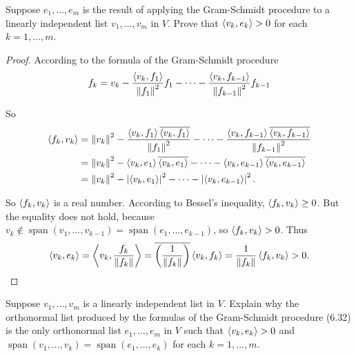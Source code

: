 \begin{exercise}\label{chapter6:sectionB:exercise9}
    Suppose $e_{1} , \ldots, e_{m}$ is the result of applying the Gram-Schmidt procedure to a linearly independent list $v_{1}, \ldots, v_{m}$ in $V$. Prove that $\left\langle{v_{k}, e_{k}}\right\rangle > 0$ for each $k = 1, \ldots, m$.
\end{exercise}

\begin{proof}
    According to the formula of the Gram-Schmidt procedure
    \[
        f_{k} = v_{k} - \frac{\left\langle{v_{k}, f_{1}}\right\rangle}{\left\Vert{f_{1}}\right\Vert^{2}}f_{1} - \cdots - \frac{\left\langle{v_{k}, f_{k-1}}\right\rangle}{\left\Vert{f_{k-1}}\right\Vert^{2}}f_{k-1}
    \]

    So
    \begin{align*}
        \left\langle{f_{k}, v_{k}}\right\rangle & = \left\Vert{v_{k}}\right\Vert^{2} - \frac{\left\langle{v_{k}, f_{1}}\right\rangle\overline{\left\langle{v_{k}, f_{1}}\right\rangle}}{\left\Vert{f_{1}}\right\Vert^{2}} - \cdots - \frac{\left\langle{v_{k}, f_{k-1}}\right\rangle\overline{\left\langle{v_{k}, f_{k-1}}\right\rangle}}{\left\Vert{f_{k-1}}\right\Vert^{2}} \\
                                 & = \left\Vert{v_{k}}\right\Vert^{2} - \left\langle{v_{k}, e_{1}}\right\rangle\overline{\left\langle{v_{k}, e_{1}}\right\rangle} - \cdots - \left\langle{v_{k}, e_{k-1}}\right\rangle\overline{\left\langle{v_{k}, e_{k-1}}\right\rangle}                                                     \\
                                 & = \left\Vert{v_{k}}\right\Vert^{2} - \left\vert{\left\langle{v_{k}, e_{1}}\right\rangle}\right\vert^{2} - \cdots - \left\vert{\left\langle{v_{k}, e_{k-1}}\right\rangle}\right\vert^{2}.
    \end{align*}

    So $\left\langle{f_{k}, v_{k}}\right\rangle$ is a real number. According to Bessel's inequality, $\left\langle{f_{k}, v_{k}}\right\rangle\geq 0$. But the equality does not hold, because $v_{k}\notin\operatorname{span}(v_{1}, \ldots, v_{k-1}) = \operatorname{span}(e_{1}, \ldots, e_{k-1})$, so $\left\langle{f_{k}, v_{k}}\right\rangle > 0$. Thus
    \[
        \left\langle{v_{k}, e_{k}}\right\rangle = \left\langle{v_{k}, \frac{f_{k}}{\left\Vert{f_{k}}\right\Vert}}\right\rangle = \overline{\left(\frac{1}{\left\Vert{f_{k}}\right\Vert}\right)}\left\langle{v_{k}, f_{k}}\right\rangle = \frac{1}{\left\Vert{f_{k}}\right\Vert}\left\langle{f_{k}, v_{k}}\right\rangle > 0.
    \]
\end{proof}
\newpage

\begin{exercise}\label{chapter6:sectionB:exercise10}
    Suppose $v_{1}, \ldots, v_{m}$ is a linearly independent list in $V$. Explain why the orthonormal list produced by the formulas of the Gram-Schmidt procedure (6.32) is the only orthonormal list $e_{1} , \ldots, e_{m}$ in $V$ such that $\left\langle{v_{k}, e_{k}}\right\rangle > 0$ and $\operatorname{span}(v_{1} , \ldots, v_{k}) = \operatorname{span}(e_{1} , \ldots, e_{k})$ for each $k = 1, \ldots, m$.
\end{exercise}

